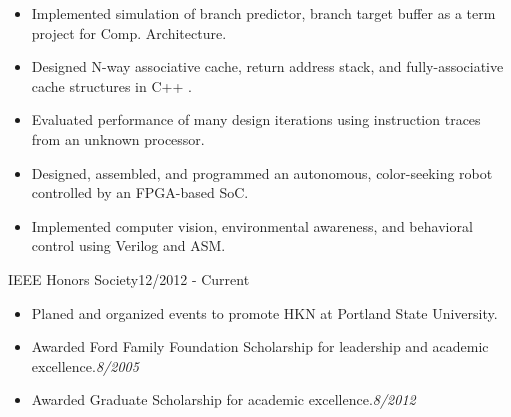 \documentclass{article}
\begin{document}
		\begin{itemize} \setlength{\itemsep}{-4pt}
			\item Implemented simulation of branch predictor, branch target buffer as a term project for Comp. Architecture.
			\item Designed N-way associative cache, return address stack, and fully-associative cache structures in C++	.
			\item Evaluated performance of many design iterations using instruction traces from an unknown processor.
		\end{itemize}	
	
	
	\begin{itemize}\setlength{\itemsep}{-4pt}
		\item Designed, assembled, and programmed an autonomous, color-seeking robot controlled by an FPGA-based SoC.  
		\item Implemented computer vision, environmental awareness, and behavioral control using Verilog and ASM.
	\end{itemize}

		
\vspace{-10pt}
\vspace{3pt}

 {IEEE Honors Society}{12/2012 - Current}

	\begin{itemize} \setlength{\itemsep}{-4pt}	
		\item Planed and organized events to promote HKN at Portland State University.
	\end{itemize}	\vspace{-2pt}


	\begin{itemize} \setlength{\itemsep}{-4pt}
		\item Awarded Ford Family Foundation Scholarship for leadership and academic excellence.\hfill\emph{8/2005}
		\item Awarded Graduate Scholarship for academic excellence.\hfill\emph{8/2012}
	\end{itemize}
\end{document}
